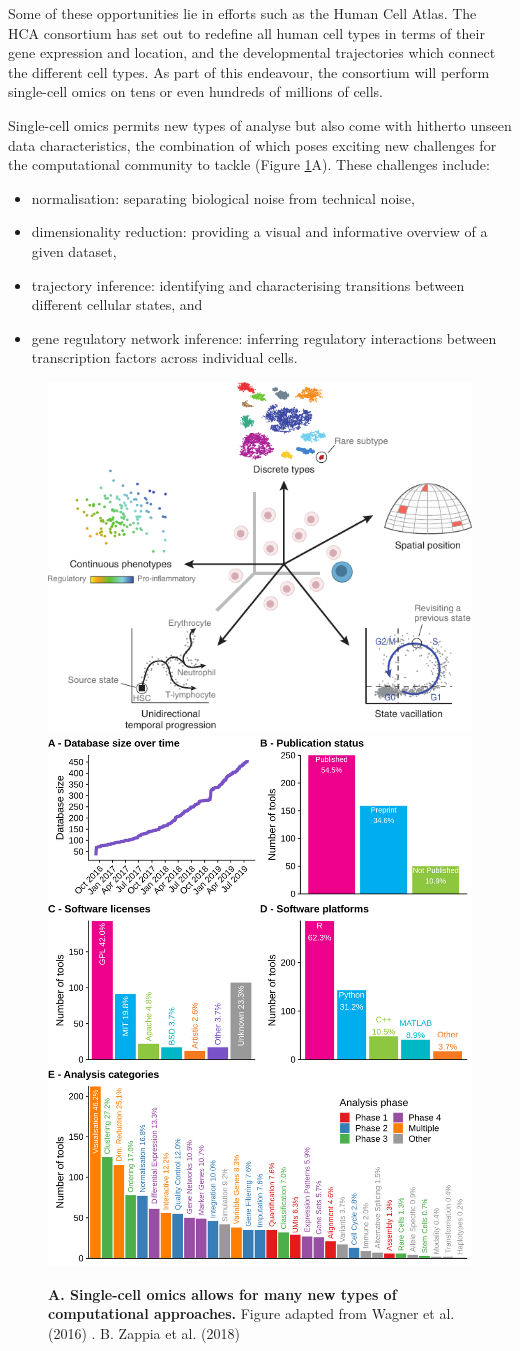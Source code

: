 Some of these opportunities lie in efforts such as the Human Cell Atlas. The HCA consortium has set out to redefine all human cell types in terms of their gene expression and location, and the developmental trajectories which connect the different cell types. As part of this endeavour, the consortium will perform single-cell omics on tens or even hundreds of millions of cells.

Single-cell omics permits new types of analyse but also come with hitherto unseen data characteristics, the combination of which poses exciting new challenges for the computational community to tackle (Figure \ref{fig:comp_tools}A)\cite{stegle_computationalanalyticalchallenges_2015,yuan_challengesemergingdirections_2017,chen_singlecellrnaseqtechnologies_2019}. These challenges include:
\begin{itemize}
	\item normalisation: separating biological noise from technical noise,
	\item dimensionality reduction: providing a visual and informative overview of a given dataset, 
	\item trajectory inference: identifying and characterising transitions between different cellular states, and
	\item gene regulatory network inference: inferring regulatory interactions between transcription factors across individual cells.
\end{itemize}

\begin{figure}[htb!]
	\centering\includegraphics[width=.5\linewidth]{fig/singlecell_tools}
	\centering\includegraphics[width=.3\linewidth]{fig/scrnatools}
	\caption{\textbf{A. Single-cell omics allows for many new types of computational approaches.} Figure adapted from Wagner et al. (2016) \cite{wagner_revealingvectorscellular_2016}.
		B. Zappia et al. (2018) \cite{zappia_exploringsinglecellrnaseq_2018}
	}
	\label{fig:comp_tools}
\end{figure}

